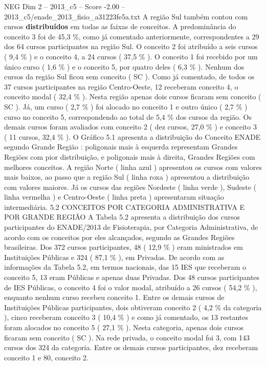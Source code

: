 \begin{textsample}{NEG Dim 2 – 2013\_c5 – Score -2.00 – 2013\_c5/enade\_2013\_fisio\_a31223fe5a.txt}
A região Sul também contou com cursos \textbf{distribuídos} em todas as faixas de conceitos.
A predominância do conceito 3 foi de 45,3 \%, como já comentado anteriormente, correspondentes a 29 dos 64 cursos participantes na região Sul.
O conceito 2 foi atribuído a seis cursos ( 9,4 \% ) e o conceito 4, a 24 cursos ( 37,5 \% ).
O conceito 1 foi recebido por um único curso ( 1,6 \% ) e o conceito 5, por quatro deles ( 6,3 \% ).
Nenhum dos cursos da região Sul ficou sem conceito ( SC ).
Como já comentado, de todos os 37 cursos participantes na região Centro-Oeste, 12 receberam conceito 4, o conceito modal ( 32,4 \% ).
Nesta região apenas dois cursos ficaram sem conceito ( SC ).
Já, um curso ( 2,7 \% ) foi alocado no conceito 1 e outro único ( 2,7 \% ) curso no conceito 5, correspondendo ao total de 5,4 \% dos cursos da região.
Os demais cursos foram avaliados com conceito 2 ( dez cursos, 27,0 \% ) e conceito 3 ( 11 cursos, 32,4 \% ).
O Gráfico 5.1 apresenta a distribuição do Conceito ENADE segundo Grande Região : poligonais mais à esquerda representam Grandes Regiões com pior distribuição, e poligonais mais à direita, Grandes Regiões com melhores conceitos.
A região Norte ( linha azul ) apresentou os cursos com valores mais baixos, ao passo que a região Sul ( linha roxa ) apresentou a distribuição com valores maiores.
Já os cursos das regiões Nordeste ( linha verde ), Sudeste ( linha vermelha ) e Centro-Oeste ( linha preta ) apresentaram situação intermediária. 5.2 CONCEITOS POR CATEGORIA ADMINISTRATIVA E POR GRANDE REGIÃO A Tabela 5.2 apresenta a distribuição dos cursos participantes do ENADE/2013 de Fisioterapia, por Categoria Administrativa, de acordo com os conceitos por eles alcançados, segundo as Grandes Regiões brasileiras.
Dos 372 cursos participantes, 48 ( 12,9 \% ) eram ministrados em Instituições Públicas e 324 ( 87,1 \% ), em Privadas.
De acordo com as informações da Tabela 5.2, em termos nacionais, das 15 IES que receberam o conceito 5, 13 eram Públicas e apenas duas Privadas.
Dos 48 cursos participantes de IES Públicas, o conceito 4 foi o valor modal, atribuído a 26 cursos ( 54,2 \% ), enquanto nenhum curso recebeu conceito 1.
Entre os demais cursos de Instituições Públicas participantes, dois obtiveram conceito 2 ( 4,2 \% da categoria ), cinco receberam conceito 3 ( 10,4 \% ) e como já comentado, os 13 restantes foram alocados no conceito 5 ( 27,1 \% ).
Nesta categoria, apenas dois cursos ficaram sem conceito ( SC ).
Na rede privada, o conceito modal foi 3, com 143 cursos dos 324 da categoria.
Entre os demais cursos participantes, dez receberam conceito 1 e 80, conceito 2.

\end{textsample}
